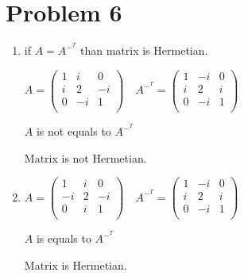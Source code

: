 \documentclass[12pt,letterpaper]{article}
\begin{document}
\section*{Problem 6}
    \begin{enumerate}[label=(\alph*)]
        \item
        if $A = A^{-^{T}}$ than matrix is Hermetian.
        
        $A = \begin{pmatrix}
            1 & i & 0 \\
            i & 2 & -i \\
            0 & -i & 1 \\
        \end{pmatrix}\quad
        A^{-^{T}} = \begin{pmatrix}
            1 & -i & 0 \\
            i & 2 & i \\
            0 & -i & 1 \\
        \end{pmatrix}$
        
        $A$ is not equals to $A^{-^{T}}$
        
        Matrix is not Hermetian.
        \item
        $A = \begin{pmatrix}
            1 & i & 0 \\
            -i & 2 & -i \\
            0 & i & 1 \\
        \end{pmatrix}\quad
        A^{-^{T}} = \begin{pmatrix}
            1 & -i & 0 \\
            i & 2 & i \\
            0 & -i & 1 \\
        \end{pmatrix}$
        
        $A$ is equals to $A^{-^{T}}$
        
        Matrix is Hermetian.
    \end{enumerate}
    
\end{document}
